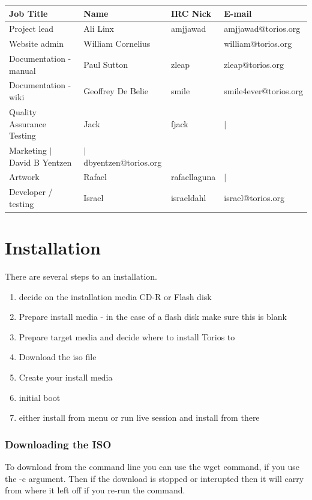 \documentclass[12pt,a4paper]{book}
\begin{document}
\begin{center}\begin{tabular}{|l|l|l|l|}
\hline \textbf{Job Title} & \textbf{Name} & \textbf{IRC Nick} & \textbf{E-mail} \\
\hline Project lead & Ali Linx & amjjawad & amjjawad@torios.org \\
\hline Website admin & William Cornelius &  & william@torios.org \\
\hline Documentation - manual & Paul Sutton & zleap	& zleap@torios.org \\
\hline Documentation - wiki & Geoffrey De Belie & smile & smile4ever@torios.org \\
\hline Quality Assurance Testing & Jack & fjack & $|$ \\
\hline Marketing $|$	David B Yentzen & $|$ dbyentzen@torios.org \\
\hline Artwork & Rafael & rafaellaguna & $|$ \\
\hline Developer / testing & Israel & israeldahl & israel@torios.org \\
\hline \end{tabular}\end{center}


\chapter{Installation}

There are several steps to an installation. \\
\begin{enumerate}
\item decide on the installation media CD-R or Flash disk
\item Prepare install media - in the case of a flash disk make sure this is blank
\item Prepare target media and decide where to install Torios to
\item Download the iso file
\item Create your install media
\item initial boot
\item either install from menu or run live session and install from there
\end{enumerate}

\subsection{Downloading the ISO}
To download from the command line you can use the wget command, if you use the -c argument.  Then if the download is stopped or interupted then it will carry from where it left off if you re-run the command.\\
\end{document}

